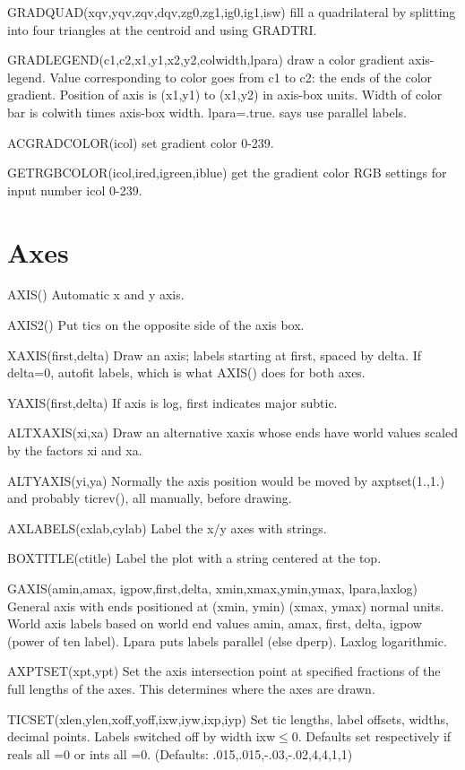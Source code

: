 \documentclass[12pt]{article}
\begin{document}
GRADQUAD(xqv,yqv,zqv,dqv,zg0,zg1,ig0,ig1,isw) fill a quadrilateral 
by splitting into four triangles at the centroid and using GRADTRI. 

GRADLEGEND(c1,c2,x1,y1,x2,y2,colwidth,lpara) draw a color gradient
axis-legend. Value corresponding to color goes from c1 to c2: the ends of
the color gradient. Position of axis is (x1,y1) to (x1,y2) in axis-box
units. Width of color bar is colwith times axis-box
width. lpara=.true. says use parallel labels.

ACGRADCOLOR(icol) set gradient color 0-239.

GETRGBCOLOR(icol,ired,igreen,iblue) get the gradient color RGB
settings for input number icol 0-239.

\section{Axes}

AXIS() Automatic x and y axis.

AXIS2() Put tics on the opposite side of the axis box.

XAXIS(first,delta) Draw an axis; labels starting at first, spaced by delta.
If delta=0, autofit labels, which is what AXIS() does for both axes.

YAXIS(first,delta) If axis is log, first indicates major subtic.

ALTXAXIS(xi,xa) Draw an alternative xaxis whose ends have world values
scaled by the factors xi and xa.

ALTYAXIS(yi,ya) Normally the axis position would be moved by
axptset(1.,1.) and probably ticrev(), all manually, before drawing.

AXLABELS(cxlab,cylab) Label the x/y axes with strings.

BOXTITLE(ctitle) Label the plot with a string centered at the top.

GAXIS(amin,amax, igpow,first,delta, xmin,xmax,ymin,ymax, lpara,laxlog)
General axis with ends positioned at (xmin, ymin) (xmax, ymax) normal
units. World axis labels based on world end values amin, amax, first, delta,
igpow (power of ten label).  Lpara puts labels parallel (else
dperp). Laxlog logarithmic.

AXPTSET(xpt,ypt) Set the axis intersection point at specified fractions of
the full lengths of the axes. This determines where the axes are drawn.

TICSET(xlen,ylen,xoff,yoff,ixw,iyw,ixp,iyp) Set tic lengths, label
offsets, widths, decimal points. Labels switched off by width
ixw$\le$0. Defaults set respectively if reals all =0 or ints all
=0. (Defaults: .015,.015,-.03,-.02,4,4,1,1)
\end{document}
